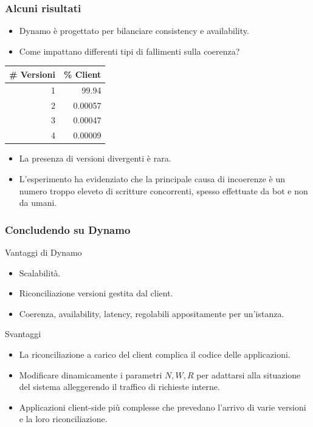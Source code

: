\begin{frame}
  \frametitle{Alcuni risultati}
  \begin{itemize}
  \item Dynamo è progettato per bilanciare consistency e availability.
  \item Come impattano differenti tipi di fallimenti sulla coerenza?
  \end{itemize}
  
  \begin{table}[ht]
  \begin{center} 
  \begin{tabular}{| r | r |}
  \hline  
  \textbf{\# Versioni} & \textbf{\% Client} \\   
  \hline
  \rowcolor{lightgray}
  1                              & 99.94 \\
  \hline
  2                              & 0.00057 \\
  \hline
  \rowcolor{lightgray}
  3                              & 0.00047 \\
  \hline
  4                              & 0.00009 \\ 
  \hline
  \end{tabular}
  \end{center}
  \end{table}

  \begin{itemize}
  \item La presenza di versioni divergenti è rara.
  \item L'esperimento ha evidenziato che la principale causa di incoerenze è un numero troppo eleveto di scritture concorrenti, spesso
    effettuate da bot e non da umani.
  \end{itemize}
\end{frame}


\begin{frame}
  \frametitle{Concludendo su Dynamo}
  \begin{block}{Vantaggi di Dynamo}
    \begin{itemize}
    \item Scalabilità.
    \item Riconciliazione versioni gestita dal client.
    \item Coerenza, availability, latency, regolabili appositamente per un'istanza.
    \end{itemize}
  \end{block}
  \begin{block}{Svantaggi}
  \begin{itemize}
  \item La riconciliazione a carico del client complica il codice delle applicazioni.
  \item Modificare dinamicamente i parametri $N, W, R$ per adattarsi alla situazione del sistema alleggerendo il traffico di richieste interne.
  \item Applicazioni client-side più complesse che prevedano l'arrivo di varie versioni e la loro riconciliazione.
  \end{itemize}
  \end{block}
\end{frame}

